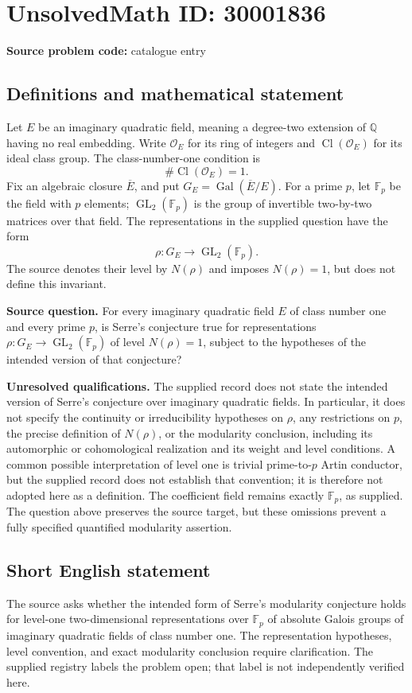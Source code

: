 \documentclass[11pt]{article}
\newcommand{\Q}{\mathbb{Q}}
\newcommand{\F}{\mathbb{F}}
\begin{document}
\section*{UnsolvedMath ID: 30001836}
\textbf{Source problem code:} catalogue entry
\subsection{Definitions and mathematical statement}
Let \(E\) be an imaginary quadratic field, meaning a degree-two extension of \(\Q\) having no real embedding. Write \(\mathcal O_E\) for its ring of integers and \(\operatorname{Cl}(\mathcal O_E)\) for its ideal class group. The class-number-one condition is
\[
\#\operatorname{Cl}(\mathcal O_E)=1.
\]
Fix an algebraic closure \(\overline E\), and put \(G_E=\operatorname{Gal}(\overline E/E)\). For a prime \(p\), let \(\F_p\) be the field with \(p\) elements; \(\operatorname{GL}_2(\F_p)\) is the group of invertible two-by-two matrices over that field. The representations in the supplied question have the form
\[
\rho:G_E\longrightarrow\operatorname{GL}_2(\F_p).
\]
The source denotes their level by \(N(\rho)\) and imposes \(N(\rho)=1\), but does not define this invariant.

\textbf{Source question.} For every imaginary quadratic field \(E\) of class number one and every prime \(p\), is Serre's conjecture true for representations \(\rho:G_E\to\operatorname{GL}_2(\F_p)\) of level \(N(\rho)=1\), subject to the hypotheses of the intended version of that conjecture?

\textbf{Unresolved qualifications.} The supplied record does not state the intended version of Serre's conjecture over imaginary quadratic fields. In particular, it does not specify the continuity or irreducibility hypotheses on \(\rho\), any restrictions on \(p\), the precise definition of \(N(\rho)\), or the modularity conclusion, including its automorphic or cohomological realization and its weight and level conditions. A common possible interpretation of level one is trivial prime-to-\(p\) Artin conductor, but the supplied record does not establish that convention; it is therefore not adopted here as a definition. The coefficient field remains exactly \(\F_p\), as supplied. The question above preserves the source target, but these omissions prevent a fully specified quantified modularity assertion.
\subsection{Short English statement}
The source asks whether the intended form of Serre's modularity conjecture holds for level-one two-dimensional representations over \(\F_p\) of absolute Galois groups of imaginary quadratic fields of class number one. The representation hypotheses, level convention, and exact modularity conclusion require clarification. The supplied registry labels the problem open; that label is not independently verified here.
\end{document}
